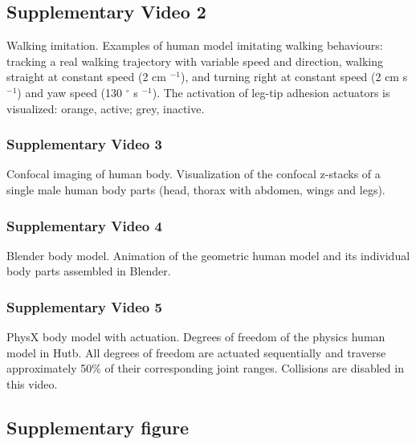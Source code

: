 \documentclass[sn-mathphys-num]{sn-jnl}%
\theoremstyle{thmstyleone}%
\theoremstyle{thmstyletwo}%
\theoremstyle{thmstylethree}%
\begin{document}
\begin{appendices}
\subsection{Supplementary Video 2} \label{sec:sup_2}

Walking imitation. 
Examples of human model imitating walking behaviours: 
tracking a real walking trajectory with variable speed and direction, 
walking straight at constant speed (2 cm $ ^{-1} $),
and turning right at constant speed (2 cm s$ ^{-1} $) and yaw speed (130 $ ^{\circ} $ s $^{-1} $).
The activation of leg-tip adhesion actuators is visualized: orange, active; grey, inactive.


\subsubsection{Supplementary Video 3} \label{sec:sup_2_1}

Confocal imaging of human body. 
Visualization of the confocal z-stacks of a single male human body parts (head, thorax with abdomen, wings and legs).


\subsubsection{Supplementary Video 4} \label{sec:sup_2_2}

Blender body model. 
Animation of the geometric human model and its individual body parts assembled in Blender.

\subsubsection{Supplementary Video 5} \label{sec:sup_2_3}

PhysX body model with actuation. 
Degrees of freedom of the physics human model in Hutb. 
All degrees of freedom are actuated sequentially and traverse approximately 50\% of their corresponding joint ranges. 
Collisions are disabled in this video.







\subsection{Supplementary figure}\label{secS1}









\end{appendices}
\end{document}
